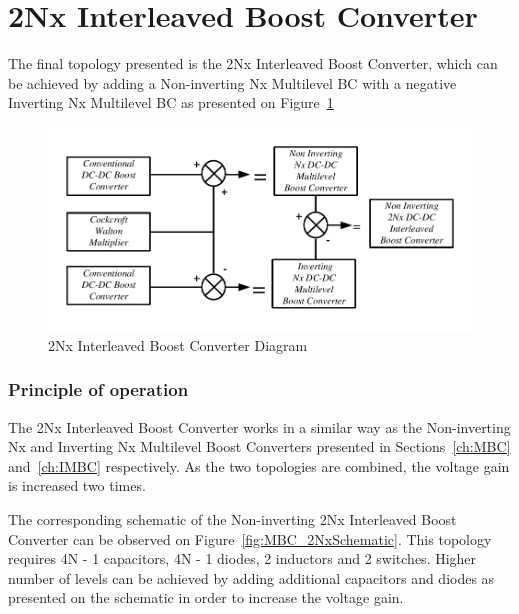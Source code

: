 \section{2Nx Interleaved Boost Converter}\label{ch:2Nx}


The final topology presented is the 2Nx Interleaved Boost Converter, which can be achieved by adding a Non-inverting Nx Multilevel BC with a negative Inverting Nx Multilevel BC as presented on Figure~\ref{fig:MBC_2NxDiagram}

\begin{figure}[H]
   \centering
   \includegraphics[width=\textwidth]{figures/yMultilevel/2Nx_Diagram.pdf}
    \caption{2Nx Interleaved Boost Converter Diagram}
	\label{fig:MBC_2NxDiagram}
\end{figure}

\subsubsection{Principle of operation}

The 2Nx Interleaved Boost Converter works in a similar way as the Non-inverting Nx and Inverting Nx Multilevel Boost Converters presented in Sections~\ref{ch:MBC} and~\ref{ch:IMBC} respectively. As the two topologies are combined, the voltage gain is increased two times.

The corresponding schematic of the Non-inverting 2Nx Interleaved Boost Converter can be observed on Figure~\ref{fig:MBC_2NxSchematic}. This topology requires 4N - 1 capacitors, 4N - 1 diodes, 2 inductors and 2 switches. Higher number of levels can be achieved by adding additional capacitors and diodes as presented on the schematic in order to increase the voltage gain.

